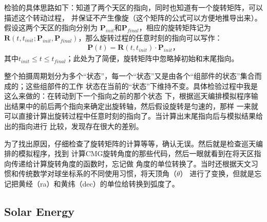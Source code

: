 检验的具体思路如下：知道了两个天区的指向，同时也知道有一个旋转矩阵，可以描述这个转动过程，
并保证不产生像旋（这个矩阵的公式可以方便地推导出来）。假设这两个天区的指向分别为
$\bm{P}_{init}$和$\bm{P}_{final}$，相应的旋转矩阵记为
$\bm{R}(t,t_{init};\bm{P}_{init},\bm{P}_{final})$，那么旋转过程的任意时刻的指向可以写作：
\begin{eqnarray}
\bm{P}(t) = \bm{R}(t,t_{init}) \cdot \bm{P}_{init} \text{，}
\end{eqnarray}
其中$t_{init} \le t \le t_{final}$；此处为了简便，旋转矩阵中忽略掉初始和末尾指向。

整个拍摄周期划分为多个“状态”，每一个“状态”又是由各个“组部件的状态”集合而成的；这些组部件的工作
状态在当前的“状态”下维持不变。具体检验过程中我是这么来做的：在转动到下一个指向之前的那个状态
下，根据巡天编排模拟程序输出结果中的前后两个指向来确定出旋转轴，然后假设旋转是匀速的，那样
一来就可以直接计算出旋转过程中任意时刻的指向了。当计算出末尾指向后与模拟结果给出的指向进行
比较，发现存在很大的差别。

为了找出原因，仔细检查了旋转矩阵的计算等等，确认无误。然后就是检查巡天编排的模拟程序，找到
计算CMG旋转角度的那些代码，然后一眼就看到在将天区指向传递给计算旋转角度的函数时，忘记做
角度的单位转换了。当时还根据天文习惯和传统数学对球坐标系的不同使用习惯，将天顶角（$\theta$）
进行了变换，但就是忘记把黄经（ra）和黄纬（dec）的单位给转换到弧度了。

\subsection{Solar Energy}
